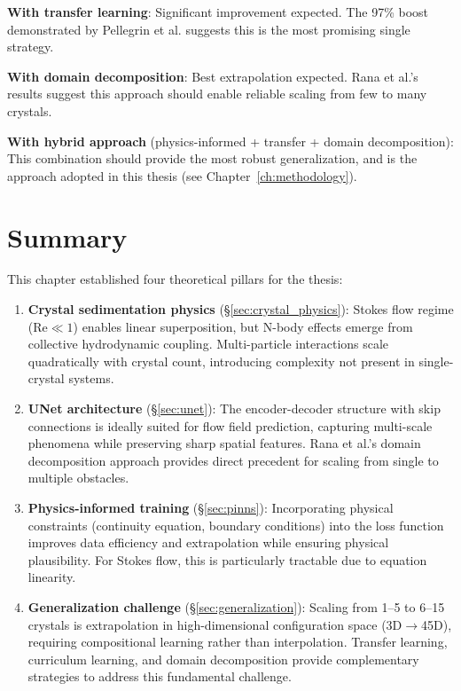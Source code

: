\textbf{With transfer learning}: Significant improvement expected. The 97\% boost demonstrated by Pellegrin et al. \cite{pellegrin2022transfer} suggests this is the most promising single strategy.

\textbf{With domain decomposition}: Best extrapolation expected. Rana et al.'s \cite{rana2024scalable_cnn} results suggest this approach should enable reliable scaling from few to many crystals.

\textbf{With hybrid approach} (physics-informed + transfer + domain decomposition): This combination should provide the most robust generalization, and is the approach adopted in this thesis (see Chapter~\ref{ch:methodology}).

\section{Summary}
\label{sec:theory_summary}

This chapter established four theoretical pillars for the thesis:

\begin{enumerate}
    \item \textbf{Crystal sedimentation physics} (\S\ref{sec:crystal_physics}): Stokes flow regime ($\text{Re} \ll 1$) enables linear superposition, but N-body effects emerge from collective hydrodynamic coupling. Multi-particle interactions scale quadratically with crystal count, introducing complexity not present in single-crystal systems.

    \item \textbf{UNet architecture} (\S\ref{sec:unet}): The encoder-decoder structure with skip connections is ideally suited for flow field prediction, capturing multi-scale phenomena while preserving sharp spatial features. Rana et al.'s \cite{rana2024scalable_cnn} domain decomposition approach provides direct precedent for scaling from single to multiple obstacles.

    \item \textbf{Physics-informed training} (\S\ref{sec:pinns}): Incorporating physical constraints (continuity equation, boundary conditions) into the loss function improves data efficiency and extrapolation while ensuring physical plausibility. For Stokes flow, this is particularly tractable due to equation linearity.

    \item \textbf{Generalization challenge} (\S\ref{sec:generalization}): Scaling from 1--5 to 6--15 crystals is extrapolation in high-dimensional configuration space (3D$\rightarrow$45D), requiring compositional learning rather than interpolation. Transfer learning, curriculum learning, and domain decomposition provide complementary strategies to address this fundamental challenge.
\end{enumerate}

